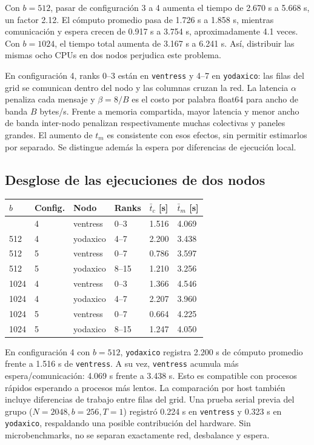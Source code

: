 \documentclass[
  spanish,
  11pt,
  a4paper,
]{article}
\newcounter{none} %
\begin{document}
Con \(b=512\), pasar de configuración 3 a 4 aumenta el tiempo de 2.670 s
a 5.668 s, un factor 2.12. El cómputo promedio pasa de 1.726 s a 1.858
s, mientras comunicación y espera crecen de 0.917 s a 3.754 s,
aproximadamente 4.1 veces. Con \(b=1024\), el tiempo total aumenta de
3.167 s a 6.241 s. Así, distribuir las mismas ocho CPUs en dos nodos
perjudica este problema.

En configuración 4, ranks 0--3 están en \texttt{ventress} y 4--7 en
\texttt{yodaxico}: las filas del grid se comunican dentro del nodo y las
columnas cruzan la red. La latencia \(\alpha\) penaliza cada mensaje y
\(\beta=8/B\) es el costo por palabra float64 para ancho de banda \(B\)
bytes/s. Frente a memoria compartida, mayor latencia y menor ancho de
banda inter-nodo penalizan respectivamente muchas colectivas y paneles
grandes. El aumento de \(t_m\) es consistente con esos efectos, sin
permitir estimarlos por separado. Se distingue además la espera por
diferencias de ejecución local.

\subsection{Desglose de las ejecuciones de dos
nodos}\label{desglose-de-las-ejecuciones-de-dos-nodos}

{\def\LTcaptype{none} %
\begin{longtable}[]{@{}llllll@{}}
\toprule\noalign{}
\(b\) & Config. & Nodo & Ranks & \(\bar t_c\) {[}s{]} & \(\bar t_m\)
{[}s{]} \\
\midrule\noalign{}
\endhead
\bottomrule\noalign{}
\endlastfoot
512 & 4 & ventress & 0--3 & 1.516 & 4.069 \\
512 & 4 & yodaxico & 4--7 & 2.200 & 3.438 \\
512 & 5 & ventress & 0--7 & 0.786 & 3.597 \\
512 & 5 & yodaxico & 8--15 & 1.210 & 3.256 \\
1024 & 4 & ventress & 0--3 & 1.366 & 4.546 \\
1024 & 4 & yodaxico & 4--7 & 2.207 & 3.960 \\
1024 & 5 & ventress & 0--7 & 0.664 & 4.225 \\
1024 & 5 & yodaxico & 8--15 & 1.247 & 4.050 \\
\end{longtable}
}

En configuración 4 con \(b=512\), \texttt{yodaxico} registra 2.200 s de
cómputo promedio frente a 1.516 s de \texttt{ventress}. A su vez,
\texttt{ventress} acumula más espera/comunicación: 4.069 s frente a
3.438 s. Esto es compatible con procesos rápidos esperando a procesos
más lentos. La comparación por host también incluye diferencias de
trabajo entre filas del grid. Una prueba serial previa del grupo
(\(N=2048,b=256,T=1\)) registró 0.224 s en \texttt{ventress} y 0.323 s
en \texttt{yodaxico}, respaldando una posible contribución del hardware.
Sin microbenchmarks, no se separan exactamente red, desbalance y espera.
\end{document}

